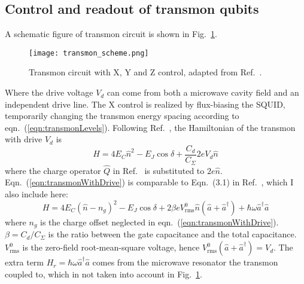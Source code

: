         
    

    \subsection{Control and readout of transmon qubits} %
    \label{sub:control_and_readout_of_transmon_qubits}

        A schematic figure of transmon circuit is shown in Fig.~\ref{fig:transmonSchematic}.

            \begin{figure}[h]
                \centering
                \texttt{[image: transmon\_scheme.png]}
                \caption{Transmon circuit with X, Y and Z control, adapted from Ref.~.}
                \label{fig:transmonSchematic}
            \end{figure}
            Where the drive voltage $V_d$ can come from both a microwave cavity field\cite{koch2007charge} and an independent drive line\cite{Barends2013Coherent}. The X control is realized by flux-biasing the SQUID, temporarily changing the transmon energy spacing according to eqn.~(\ref{eqn:transmonLevels}). Following Ref.~, the Hamiltonian of the transmon with drive $ V_d $ is
            \begin{equation}
            \label{eqn:transmonWithDrive}
                H = 4E_C \hat n^2  - E_J \cos \delta + \frac{C_d}{C_\Sigma} 2eV_d \hat n
            \end{equation}
            where the charge operator $\hat Q$ in Ref.~ is substituted to $ 2e \hat n $. Eqn.~(\ref{eqn:transmonWithDrive}) is comparable to Eqn.~(3.1) in Ref.~, which I also include here:
            \begin{equation}
            \label{eqn:transmonWithCavityDrive}
                H = 4E_C (\hat n - n_g)^2 - E_J \cos \delta +2 \beta e V^0_{\text{rms}}\hat n( \hat a + \hat a^\dagger ) + \hbar \omega \hat a^\dagger \hat a
            \end{equation}
            where $n_g$ is the charge offset neglected in eqn.~(\ref{eqn:transmonWithDrive}). $ \beta = C_d/C_\Sigma $ is the ratio between the gate capacitance and the total capacitance. $V^0_{\text{rms}} $ is the zero-field root-mean-square voltage, hence $V^0_{\text{rms}}( \hat a + \hat a^\dagger ) = V_d$. The extra term $H_r = \hbar \omega \hat a^\dagger \hat a$ comes from the microwave resonator the transmon coupled to, which in not taken into account in Fig.~\ref{fig:transmonSchematic}.

